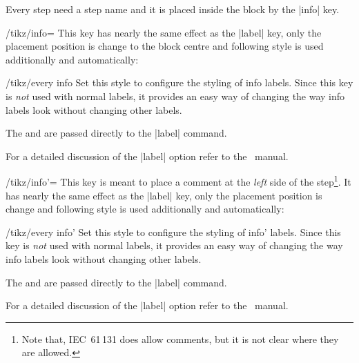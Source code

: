 \documentclass[a4paper]{ltxdoc}
\begin{document}
Every step need a step name and it is placed inside the block by the |info| key. 
\begin{key}{/tikz/info=}
  This key has nearly the same effect as the |label| key, only the placement position is change to the block centre and following style is used additionally and automatically:
  \begin{stylekey}{/tikz/every info}
    Set this style to configure the styling of info labels. Since this
    key is \emph{not} used with normal labels, it provides an easy way
    of changing the way info labels look without changing other
    labels.
  \end{stylekey}
  The  and  are passed directly to the
  |label| command.
\begin{codeexample}[width=3cm]
\end{codeexample}

  For a detailed discussion of the |label| option refer to the \tikzname\ manual.
\end{key}

\begin{key}{/tikz/info'=}
  This key is meant to place a comment at the \emph{left} side of the step\footnote{Note that, IEC~61\,131 does allow comments, but it is not clear where they are allowed.}. It has nearly the same effect as the |label| key, only the placement position is change and following style is used additionally and automatically:
  \begin{stylekey}{/tikz/every info'}
    Set this style to configure the styling of info' labels. Since this
    key is \emph{not} used with normal labels, it provides an easy way
    of changing the way info labels look without changing other
    labels.
  \end{stylekey}
  The  and  are passed directly to the |label| command.
\begin{codeexample}[width=3.2cm]
\end{codeexample}
  For a detailed discussion of the |label| option refer to the \tikzname\ manual. %
\end{key}
\end{document}
